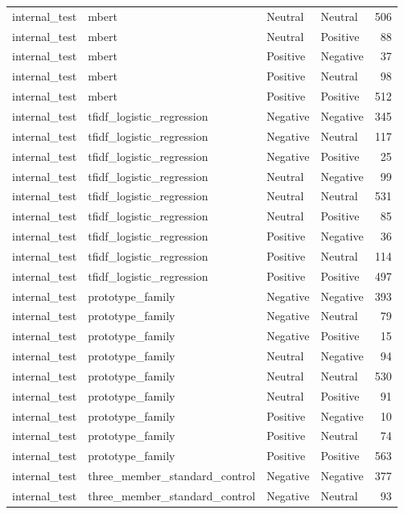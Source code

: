 \begin{tabular}{llllr}
internal\_test & mbert & Neutral & Neutral & 506 \\
internal\_test & mbert & Neutral & Positive & 88 \\
internal\_test & mbert & Positive & Negative & 37 \\
internal\_test & mbert & Positive & Neutral & 98 \\
internal\_test & mbert & Positive & Positive & 512 \\
internal\_test & tfidf\_logistic\_regression & Negative & Negative & 345 \\
internal\_test & tfidf\_logistic\_regression & Negative & Neutral & 117 \\
internal\_test & tfidf\_logistic\_regression & Negative & Positive & 25 \\
internal\_test & tfidf\_logistic\_regression & Neutral & Negative & 99 \\
internal\_test & tfidf\_logistic\_regression & Neutral & Neutral & 531 \\
internal\_test & tfidf\_logistic\_regression & Neutral & Positive & 85 \\
internal\_test & tfidf\_logistic\_regression & Positive & Negative & 36 \\
internal\_test & tfidf\_logistic\_regression & Positive & Neutral & 114 \\
internal\_test & tfidf\_logistic\_regression & Positive & Positive & 497 \\
internal\_test & prototype\_family & Negative & Negative & 393 \\
internal\_test & prototype\_family & Negative & Neutral & 79 \\
internal\_test & prototype\_family & Negative & Positive & 15 \\
internal\_test & prototype\_family & Neutral & Negative & 94 \\
internal\_test & prototype\_family & Neutral & Neutral & 530 \\
internal\_test & prototype\_family & Neutral & Positive & 91 \\
internal\_test & prototype\_family & Positive & Negative & 10 \\
internal\_test & prototype\_family & Positive & Neutral & 74 \\
internal\_test & prototype\_family & Positive & Positive & 563 \\
internal\_test & three\_member\_standard\_control & Negative & Negative & 377 \\
internal\_test & three\_member\_standard\_control & Negative & Neutral & 93 \\

\end{tabular}

